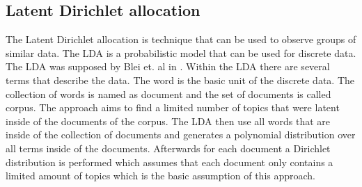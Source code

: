 \subsection{Latent Dirichlet allocation} %
\label{sub:lda}

The Latent Dirichlet allocation is technique that can be used to observe groups of similar data. The LDA is a probabilistic model that can be used for discrete data. The LDA was supposed by Blei et. al in \cite{blei_latent_nodate}.
Within the LDA there are several terms that describe the data. The word is the basic unit of the discrete data. The collection of words is named as document and the set of documents is called corpus.
The approach aims to find a limited number of topics that were latent inside of the documents of the corpus.
The LDA then use all words that are inside of the collection of documents and generates a polynomial distribution over all terms inside of the documents. Afterwards for each document a Dirichlet distribution is performed which assumes that each document only contains a limited amount of topics which is the basic assumption of this approach.

